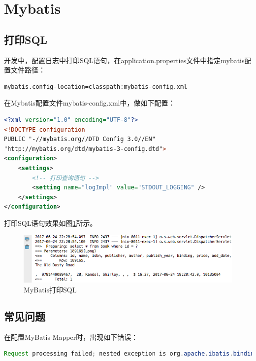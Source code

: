 \documentclass[letter]{book}
\begin{document}
\section{Mybatis}


\subsection{打印SQL}

开发中，配置日志中打印SQL语句，在application.properties文件中指定mybatis配置文件路径：

\begin{lstlisting}[language=Bash]
mybatis.config-location=classpath:mybatis-config.xml
\end{lstlisting}

在Mybatis配置文件mybatis-config.xml中，做如下配置：

\begin{lstlisting}[language=XML]
<?xml version="1.0" encoding="UTF-8"?>
<!DOCTYPE configuration
PUBLIC "-//mybatis.org//DTD Config 3.0//EN"
"http://mybatis.org/dtd/mybatis-3-config.dtd">
<configuration>
	<settings>
		<!-- 打印查询语句 -->
		<setting name="logImpl" value="STDOUT_LOGGING" />
	</settings>
</configuration>
\end{lstlisting}

打印SQL语句效果如图\ref{fig:mybatisprintsql}所示。

\begin{figure}[htbp]
	\centering
	\includegraphics[scale=0.5]{mybatisprintsql.png}
	\caption{MyBatis打印SQL}
	\label{fig:mybatisprintsql}
\end{figure}

\subsection{常见问题}

在配置MyBatis Mapper时，出现如下错误：

\begin{lstlisting}[language=Java]
Request processing failed; nested exception is org.apache.ibatis.binding.BindingException: Invalid bound statement (not found)
\end{lstlisting}
\end{document}
